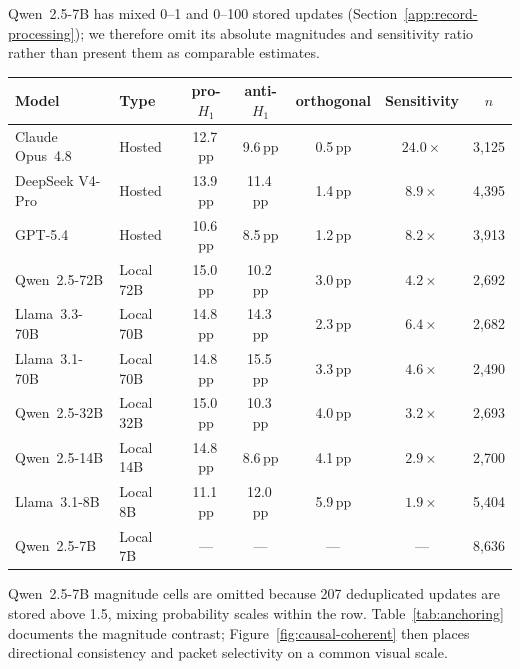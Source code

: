 Qwen~2.5-7B has mixed 0--1 and 0--100 stored updates
(Section~\ref{app:record-processing}); we therefore omit its absolute magnitudes
and sensitivity ratio rather than present them as comparable estimates.

\begin{center}
\begin{minipage}{\linewidth}
\centering
{}
\label{tab:anchoring}
\small
\begin{tabular}{llccccc}
\toprule
\textbf{Model} & \textbf{Type} & pro-$H_1$ & anti-$H_1$ & orthogonal
  & \textbf{Sensitivity} & $n$ \\
\midrule
Claude Opus~4.8 & Hosted  & 12.7\,pp & 9.6\,pp  & 0.5\,pp & $24.0\times$ & 3{,}125 \\
DeepSeek V4-Pro & Hosted  & 13.9\,pp & 11.4\,pp & 1.4\,pp & $8.9\times$  & 4{,}395 \\
GPT-5.4         & Hosted  & 10.6\,pp & 8.5\,pp  & 1.2\,pp & $8.2\times$  & 3{,}913 \\
\midrule
Qwen~2.5-72B    & Local 72B & 15.0\,pp & 10.2\,pp & 3.0\,pp & $4.2\times$  & 2{,}692 \\
Llama~3.3-70B   & Local 70B & 14.8\,pp & 14.3\,pp & 2.3\,pp & $6.4\times$  & 2{,}682 \\
Llama~3.1-70B   & Local 70B & 14.8\,pp & 15.5\,pp & 3.3\,pp & $4.6\times$  & 2{,}490 \\
Qwen~2.5-32B    & Local 32B & 15.0\,pp & 10.3\,pp & 4.0\,pp & $3.2\times$  & 2{,}693 \\
Qwen~2.5-14B    & Local 14B & 14.8\,pp &  8.6\,pp & 4.1\,pp & $2.9\times$  & 2{,}700 \\
Llama~3.1-8B    & Local 8B  & 11.1\,pp & 12.0\,pp & 5.9\,pp & $1.9\times$ & 5{,}404 \\
Qwen~2.5-7B     & Local 7B  & --- & --- & --- & --- & 8{,}636 \\
\bottomrule
\end{tabular}
\end{minipage}
\end{center}
Qwen~2.5-7B magnitude cells are omitted because 207 deduplicated updates are
stored above 1.5, mixing probability scales within the row.
Table~\ref{tab:anchoring} documents the magnitude contrast; Figure~\ref{fig:causal-coherent} then places directional consistency and packet selectivity on a common visual scale.

